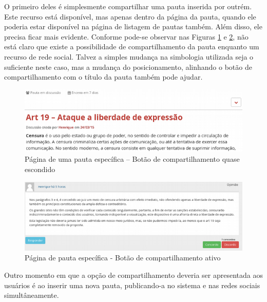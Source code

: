 	O primeiro deles é simplesmente compartilhar uma pauta inserida por outrém. Este recurso está disponível, mas apenas dentro da página da pauta, quando ele poderia estar disponível na página de listagem de pautas também. Além disso, ele precisa ficar mais evidente. Conforme pode-se observar nas Figuras \ref{fig:pauta-espec-mcivil-share-comentario-fechado} e \ref{fig:pauta-espec-mcivil-share-comentario-ativo}, não está claro que existe a possibilidade de compartilhamento da pauta enquanto um recurso de rede social. Talvez a simples mudança na simbologia utilizada seja o suficiente neste caso, mas a mudança do posicionamento, alinhando o botão de compartilhamento com o título da pauta também pode ajudar.
    \begin{figure}[htb]%
        \begin{center}
            \includegraphics[scale=0.7]{./imagens/mcivil-social-share-01.png}%
        \end{center}%
        \caption{Página de uma pauta específica – Botão de compartilhamento quase escondido \label{fig:pauta-espec-mcivil-share-comentario-fechado}}%
    \end{figure}%
    \begin{figure}[htb]%
        \begin{center}
            \includegraphics[scale=0.7]{./imagens/mcivil-comentario-pauta.png}%
        \end{center}%
        \caption{Página de pauta específica - Botão de compartilhamento ativo \label{fig:pauta-espec-mcivil-share-comentario-ativo}}%
    \end{figure}%
	Outro momento em que a opção de compartilhamento deveria ser apresentada aos usuários é ao inserir uma nova pauta, publicando-a no sistema e nas redes sociais simultâneamente.
	
